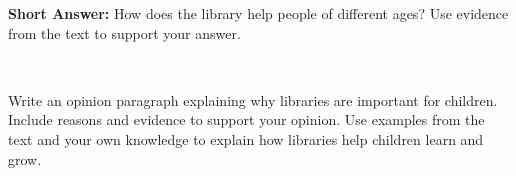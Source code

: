 \documentclass[12pt]{article}
\begin{document}
\begin{tcolorbox}[colframe=black!50, colback=white, title=Question 9]
\textbf{Short Answer:} How does the library help people of different ages? Use evidence from the text to support your answer.  

\vspace{2em}
 \underline{\hspace{15.8cm}}  
    \\[0.8cm] \underline{\hspace{15.8cm}}  
\end{tcolorbox}

\begin{tcolorbox}[colframe=black!50, colback=white, title=Question 10: Writing Performance Task]
Write an opinion paragraph explaining why libraries are important for children. Include reasons and evidence to support your opinion. Use examples from the text and your own knowledge to explain how libraries help children learn and grow.

\vspace{2em}
 \underline{\hspace{15.8cm}}  
    \\[0.8cm] \underline{\hspace{15.8cm}}  
    \\[0.8cm] \underline{\hspace{15.8cm}}  
    \\[0.8cm] \underline{\hspace{15.8cm}}  
    \\[0.8cm] \underline{\hspace{15.8cm}}  
    \\[0.8cm] \underline{\hspace{15.8cm}}
\end{tcolorbox}
\end{document}
